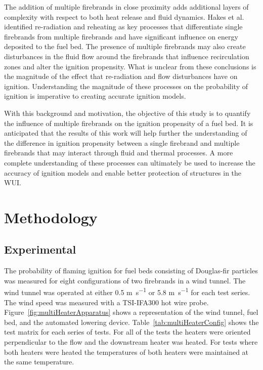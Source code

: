     The addition of multiple firebrands in close proximity adds additional layers of complexity with respect to both heat release and fluid dynamics. Hakes et al.~\cite{Hakes2019a} identified re-radiation and reheating as key processes that differentiate single firebrands from multiple firebrands and have significant influence on energy deposited to the fuel bed. The presence of multiple firebrands may also create disturbances in the fluid flow around the firebrands that influence recirculation zones and alter the ignition propensity. What is unclear from these conclusions is the magnitude of the effect that re-radiation and flow disturbances have on ignition. Understanding the magnitude of these processes on the probability of ignition is imperative to creating accurate ignition models. 
    
    With this background and motivation, the objective of this study is to quantify the influence of multiple firebrands on the ignition propensity of a fuel bed. It is anticipated that the results of this work will help further the understanding of the difference in ignition propensity between a single firebrand and multiple firebrands that may interact through fluid and thermal processes. A more complete understanding of these processes can ultimately be used to increase the accuracy of ignition models and enable better protection of structures in the WUI.
    
    
\section{Methodology}
    \subsection{Experimental}
    The probability of flaming ignition for fuel beds consisting of Douglas-fir particles was measured for eight configurations of two firebrands in a wind tunnel. The wind tunnel was operated at either 0.5 \si{\meter\per\second} or 5.8 \si{\meter\per\second} for each test series. The wind speed was measured with a TSI-IFA300 hot wire probe. Figure~\ref{fig:multiHeaterApparatus} shows a representation of the wind tunnel, fuel bed, and the automated lowering device. Table~\ref{tab:multiHeaterConfig} shows the test matrix for each series of tests. For all of the tests the heaters were oriented perpendicular to the flow and the downstream heater was heated. For tests where both heaters were heated the temperatures of both heaters were maintained at the same temperature. 
    
